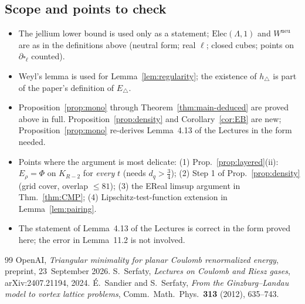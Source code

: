 \documentclass[11pt]{article}
\theoremstyle{definition}
\theoremstyle{remark}
\newcommand{\Lam}{\Lambda}
\newcommand{\Wneu}{W^{\mathrm{neu}}}
\begin{document}
\subsection{Scope and points to check}
\begin{itemize}
\item The jellium lower bound is used only as a statement; $\mathrm{Elec}(\Lam,1)$ and $\Wneu$ are as in the definitions above (neutral form; real $\ell$; closed cubes; points on $\partial\square_\ell$ counted).
\item Weyl's lemma is used for Lemma~\ref{lem:regularity}; the existence of $h_\triangle$ is part of the paper's definition of $E_\triangle$.
\item Proposition~\ref{prop:mono} through Theorem~\ref{thm:main-deduced} are proved above in full.  Proposition~\ref{prop:density} and Corollary~\ref{cor:EB} are new; Proposition~\ref{prop:mono} re-derives Lemma~4.13 of the Lectures in the form needed.
\item Points where the argument is most delicate: (1) Prop.~\ref{prop:layered}(ii): $E_\rho=\Phi$ on $K_{R-2}$ for \emph{every} $t$ (needs $d_q>\frac34$); (2) Step 1 of Prop.~\ref{prop:density} (grid cover, overlap $\le81$); (3) the EReal limsup argument in Thm.~\ref{thm:CMP}; (4) Lipschitz-test-function extension in Lemma~\ref{lem:pairing}.
\item The statement of Lemma~4.13 of the Lectures is correct in the form proved here; the error in Lemma~11.2 is not involved.
\end{itemize}

\begin{thebibliography}{99}
 OpenAI, \emph{Triangular minimality for planar Coulomb renormalized energy}, preprint, 23~September 2026.
 S.~Serfaty, \emph{Lectures on Coulomb and Riesz gases}, arXiv:2407.21194, 2024.
 \'E.~Sandier and S.~Serfaty, \emph{From the Ginzburg--Landau model to vortex lattice problems}, Comm.\ Math.\ Phys.\ \textbf{313} (2012), 635--743.
\end{thebibliography}
\end{document}
